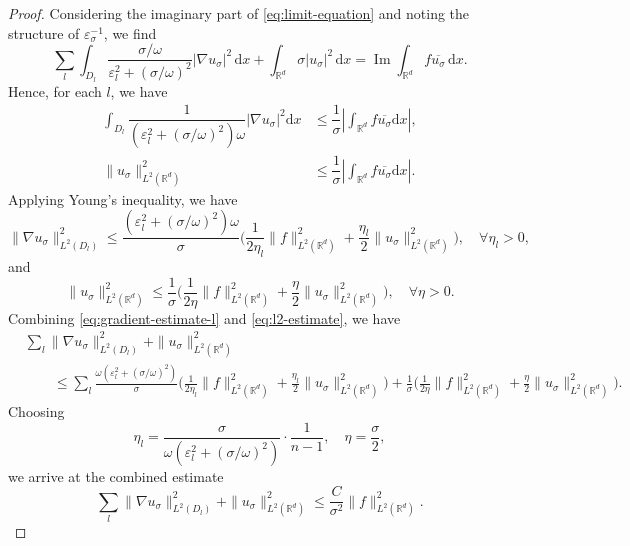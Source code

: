 \documentclass[10pt,a4paper]{amsart}
\begin{document}
\begin{proof}
Considering the imaginary part of \eqref{eq:limit-equation} and noting the structure of $\varepsilon_\sigma^{-1}$, we find
\begin{equation*}
    \sum_{l} \int_{D_l} \frac{\sigma/\omega}{\varepsilon_l^2 + (\sigma/\omega)^2} |\nabla u_\sigma|^2\,\mathrm{d}x + \int_{\mathbb{R}^d} \sigma |u_\sigma|^2\,\mathrm{d}x = \operatorname{Im} \int_{\mathbb{R}^d} f\overline{u_\sigma}\,\mathrm{d}x.
\end{equation*}
Hence, for each $l$, we have
\begin{align}
\int_{D_l}\dfrac{1}{(\varepsilon_{l}^2+(\sigma/\omega)^2)\omega}|\nabla u_\sigma|^2\mathrm{d}x &\leq \dfrac{1}{\sigma}\left|\int_{\mathbb{R}^d}f\overline{u_\sigma}\mathrm{d}x\right|, \label{eq:l2-grad-l} \\
\|u_\sigma\|_{L^2(\mathbb{R}^d)}^2 &\leq \dfrac{1}{\sigma}\left|\int_{\mathbb{R}^d}f\overline{u_\sigma}\mathrm{d}x\right|. \label{eq:l2-norm-u}
\end{align}
Applying Young's inequality, we have
\begin{equation}\label{eq:gradient-estimate-l}
\|\nabla u_\sigma\|_{L^2(D_l)}^2 \leq \frac{(\varepsilon_l^2 + (\sigma/\omega)^2)\omega}{\sigma}\biggl(\frac{1}{2\eta_l}\|f\|_{L^2(\mathbb{R}^d)}^2 + \frac{\eta_l}{2}\|u_\sigma\|_{L^2(\mathbb{R}^d)}^2\biggr), \quad \forall \eta_l > 0,
\end{equation}
and
\begin{equation}\label{eq:l2-estimate}
\|u_\sigma\|_{L^2(\mathbb{R}^d)}^2 \leq \frac{1}{\sigma}\biggl(\frac{1}{2\eta}\|f\|_{L^2(\mathbb{R}^d)}^2 + \frac{\eta}{2}\|u_\sigma\|_{L^2(\mathbb{R}^d)}^2\biggr), \quad \forall \eta > 0.
\end{equation}
Combining \eqref{eq:gradient-estimate-l} and \eqref{eq:l2-estimate}, we have
\begin{align*}
&\sum_{l} \|\nabla u_\sigma\|_{L^2(D_l)}^2 + \|u_\sigma\|_{L^2(\mathbb{R}^d)}^2 \\
&\qquad \leq \sum_{l} \frac{\omega(\varepsilon_l^2 + (\sigma/\omega)^2)}{\sigma}\biggl(\frac{1}{2\eta_l}\|f\|_{L^2(\mathbb{R}^d)}^2 + \frac{\eta_l}{2}\|u_\sigma\|_{L^2(\mathbb{R}^d)}^2\biggr) + \frac{1}{\sigma}\biggl(\frac{1}{2\eta}\|f\|_{L^2(\mathbb{R}^d)}^2 + \frac{\eta}{2}\|u_\sigma\|_{L^2(\mathbb{R}^d)}^2\biggr).
\end{align*}
Choosing
\[
\eta_l = \frac{\sigma}{\omega(\varepsilon_l^2 + (\sigma/\omega)^2)} \cdot \frac{1}{n-1}, \quad \eta = \frac{\sigma}{2},
\]
 we arrive at the combined estimate
\begin{equation}\label{eq:combined-estimate}
\sum_{l} \|\nabla u_\sigma\|_{L^2(D_l)}^2 + \|u_\sigma\|_{L^2(\mathbb{R}^d)}^2 \leq \frac{C}{\sigma^2}\|f\|_{L^2(\mathbb{R}^d)}^2.
\end{equation}






\end{proof}
\end{document}
